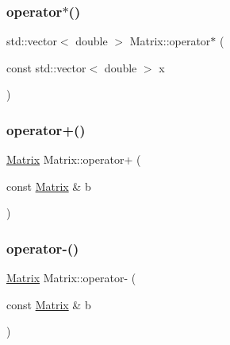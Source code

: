 \mbox{\label{class_matrix_a049af5ca6904481796a79f94d8cbef31}} 
\subsubsection{\texorpdfstring{operator$\ast$()}{operator*()}\hspace{0.1cm}{\footnotesize\ttfamily [2/2]}}
{\footnotesize\ttfamily std\+::vector$<$ double $>$ Matrix\+::operator$\ast$ (\begin{DoxyParamCaption}\item[{const std\+::vector$<$ double $>$}]{x }\end{DoxyParamCaption})}

\mbox{\label{class_matrix_ab5df6e16d56f931d712dc3b739f3e56d}} 
\subsubsection{\texorpdfstring{operator+()}{operator+()}}
{\footnotesize\ttfamily \mbox{\hyperlink{class_matrix}{Matrix}} Matrix\+::operator+ (\begin{DoxyParamCaption}\item[{const \mbox{\hyperlink{class_matrix}{Matrix}} \&}]{b }\end{DoxyParamCaption})}

\mbox{\label{class_matrix_ae9f9af2349c3f6520a75116ceba73a77}} 
\subsubsection{\texorpdfstring{operator-\/()}{operator-()}}
{\footnotesize\ttfamily \mbox{\hyperlink{class_matrix}{Matrix}} Matrix\+::operator-\/ (\begin{DoxyParamCaption}\item[{const \mbox{\hyperlink{class_matrix}{Matrix}} \&}]{b }\end{DoxyParamCaption})}

\mbox{\label{class_matrix_a0355fb02a7719e9b81938702eae3abe2}} 
